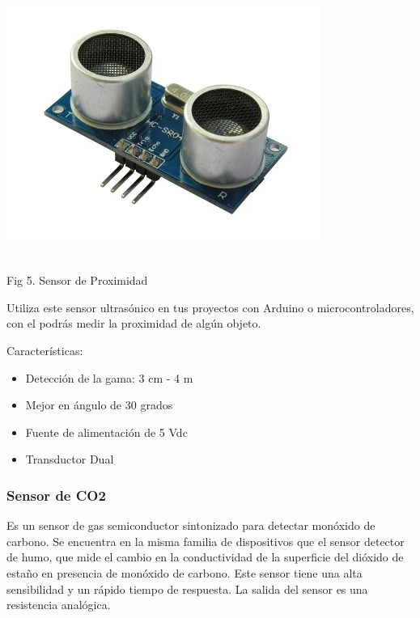 \documentclass[12pt]{report}
\begin{document}
 \begin{center}
\includegraphics[scale=1.1]{Documento/Figuras/fig6.jpg}
\begin{scriptsize}\\ 
Fig 5. Sensor de Proximidad
\end{scriptsize}
\end{center}

Utiliza este sensor ultrasónico en tus proyectos con Arduino o microcontroladores, con el podrás medir la proximidad de algún objeto.

Características:
\begin{itemize}
    \item Detección de la gama: 3 cm - 4 m
    \item Mejor en ángulo de 30 grados
    \item Fuente de alimentación de 5 Vdc
    \item Transductor Dual
\end{itemize}

\subsubsection{Sensor de CO2}
Es un sensor de gas semiconductor sintonizado para detectar monóxido de carbono. Se encuentra en la misma familia de dispositivos que el sensor detector de humo, que mide el cambio en la conductividad de la superficie del dióxido de estaño en presencia de monóxido de carbono. Este sensor tiene una alta sensibilidad y un rápido tiempo de respuesta. La salida del sensor es una resistencia analógica.
\end{document}
